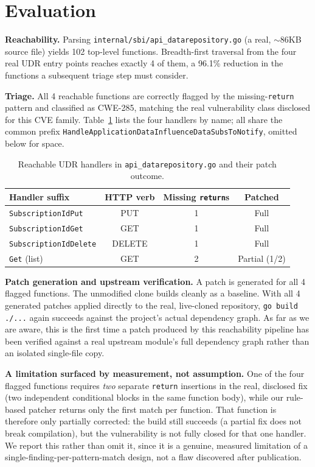 \documentclass[sigconf]{acmart}
\begin{document}
\section{Evaluation}

\textbf{Reachability.} Parsing
\texttt{internal/sbi/\allowbreak api\_datarepository.go} (a real, $\sim$86KB source
file) yields 102 top-level functions. Breadth-first traversal from the
four real UDR entry points reaches exactly 4 of them, a 96.1\%
reduction in the functions a subsequent triage step must consider.

\textbf{Triage.} All 4 reachable functions are correctly flagged by the
missing-\texttt{return} pattern and classified as CWE-285, matching the
real vulnerability class disclosed for this CVE family. Table~\ref{tab:handlers}
lists the four handlers by name; all share the common prefix
\texttt{HandleApplicationDataInfluenceDataSubsToNotify}, omitted below for
space.

\begin{table}[t]
\centering
\caption{Reachable UDR handlers in \texttt{api\_datarepository.go} and their patch outcome.}
\label{tab:handlers}
\small
\begin{tabular}{@{}lccc@{}}
\toprule
Handler suffix & HTTP verb & Missing \texttt{return}s & Patched \\
\midrule
\texttt{SubscriptionIdPut} & PUT & 1 & Full \\
\texttt{SubscriptionIdGet} & GET & 1 & Full \\
\texttt{SubscriptionIdDelete} & DELETE & 1 & Full \\
\texttt{Get} (list) & GET & 2 & Partial (1/2) \\
\bottomrule
\end{tabular}
\end{table}

\textbf{Patch generation and upstream verification.} A patch is
generated for all 4 flagged functions. The unmodified clone builds
cleanly as a baseline. With all 4 generated patches applied directly to
the real, live-cloned repository, \texttt{go build ./...} again
succeeds against the project's actual dependency graph. As far as we
are aware, this is the first time a patch produced by this
reachability pipeline has been verified against a real upstream
module's full dependency graph rather than an isolated single-file
copy.

\textbf{A limitation surfaced by measurement, not assumption.} One of
the four flagged functions requires \emph{two} separate
\texttt{return} insertions in the real, disclosed fix (two
independent conditional blocks in the same function body), while our
rule-based patcher returns only the first match per function. That
function is therefore only partially corrected: the build still
succeeds (a partial fix does not break compilation), but the
vulnerability is not fully closed for that one handler. We report this
rather than omit it, since it is a genuine, measured limitation of a
single-finding-per-pattern-match design, not a flaw discovered after
publication.
\end{document}
